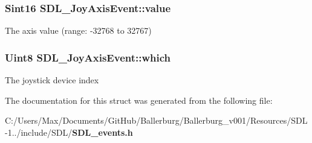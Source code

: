 \subsubsection[{value}]{\setlength{\rightskip}{0pt plus 5cm}Sint16 S\+D\+L\+\_\+\+Joy\+Axis\+Event\+::value}\label{struct_s_d_l___joy_axis_event_a53ee73e7c367934dd6edb69963be5556}
The axis value (range\+: -\/32768 to 32767) 
\subsubsection[{which}]{\setlength{\rightskip}{0pt plus 5cm}Uint8 S\+D\+L\+\_\+\+Joy\+Axis\+Event\+::which}\label{struct_s_d_l___joy_axis_event_a41a7483a5520986f340808da16e08775}
The joystick device index 

The documentation for this struct was generated from the following file\+:\begin{DoxyCompactItemize}
\item 
C\+:/\+Users/\+Max/\+Documents/\+Git\+Hub/\+Ballerburg/\+Ballerburg\+\_\+v001/\+Resources/\+S\+D\+L-\/1../include/\+S\+D\+L/{\bf S\+D\+L\+\_\+events.\+h}\end{DoxyCompactItemize}
